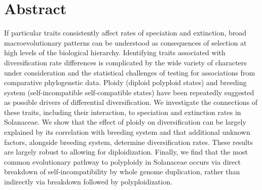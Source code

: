 \section{Abstract}

If particular traits consistently affect rates of speciation and extinction, broad macroevolutionary patterns can be understood as consequences of selection at high levels of the biological hierarchy.
Identifying traits associated with diversification rate differences is complicated by the wide variety of characters under consideration and the statistical challenges of testing for associations from comparative phylogenetic data.
Ploidy (diploid \vs polyploid states) and breeding system (self-incompatible \vs self-compatible states) have been repeatedly suggested as possible drivers of differential diversification.
We investigate the connections of these traits, including their interaction, to speciation and extinction rates in Solanaceae.
We show that the effect of ploidy on diversification can be largely explained by its correlation with breeding system and that additional unknown factors, alongside breeding system, determine diversification rates.
These results are largely robust to allowing for diploidization.
Finally, we find that the most common evolutionary pathway to polyploidy in Solanaceae occurs via direct breakdown of self-incompatibility by whole genome duplication, rather than indirectly via breakdown followed by polyploidization.
